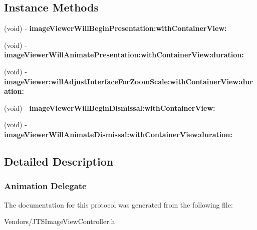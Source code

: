 \subsection*{Instance Methods}
\begin{DoxyCompactItemize}
\item 
\hypertarget{protocol_j_t_s_image_view_controller_animation_delegate-p_a903e84c2c9b29d2c951069646a31a2cf}{}(void) -\/ {\bfseries image\+Viewer\+Will\+Begin\+Presentation\+:with\+Container\+View\+:}\label{protocol_j_t_s_image_view_controller_animation_delegate-p_a903e84c2c9b29d2c951069646a31a2cf}

\item 
\hypertarget{protocol_j_t_s_image_view_controller_animation_delegate-p_a59e9d47d3c38487a5a301b0f670a1b74}{}(void) -\/ {\bfseries image\+Viewer\+Will\+Animate\+Presentation\+:with\+Container\+View\+:duration\+:}\label{protocol_j_t_s_image_view_controller_animation_delegate-p_a59e9d47d3c38487a5a301b0f670a1b74}

\item 
\hypertarget{protocol_j_t_s_image_view_controller_animation_delegate-p_a19f506c0dd199e4db742af011282724e}{}(void) -\/ {\bfseries image\+Viewer\+:will\+Adjust\+Interface\+For\+Zoom\+Scale\+:with\+Container\+View\+:duration\+:}\label{protocol_j_t_s_image_view_controller_animation_delegate-p_a19f506c0dd199e4db742af011282724e}

\item 
\hypertarget{protocol_j_t_s_image_view_controller_animation_delegate-p_a7170e1b618f6e2f532d920ca0fb89d3d}{}(void) -\/ {\bfseries image\+Viewer\+Will\+Begin\+Dismissal\+:with\+Container\+View\+:}\label{protocol_j_t_s_image_view_controller_animation_delegate-p_a7170e1b618f6e2f532d920ca0fb89d3d}

\item 
\hypertarget{protocol_j_t_s_image_view_controller_animation_delegate-p_a098bca93d1c1c156b9dd595f0b305e01}{}(void) -\/ {\bfseries image\+Viewer\+Will\+Animate\+Dismissal\+:with\+Container\+View\+:duration\+:}\label{protocol_j_t_s_image_view_controller_animation_delegate-p_a098bca93d1c1c156b9dd595f0b305e01}

\end{DoxyCompactItemize}


\subsection{Detailed Description}


 \subsubsection*{Animation Delegate }

The documentation for this protocol was generated from the following file\+:\begin{DoxyCompactItemize}
\item 
Vendors/J\+T\+S\+Image\+View\+Controller.\+h\end{DoxyCompactItemize}
